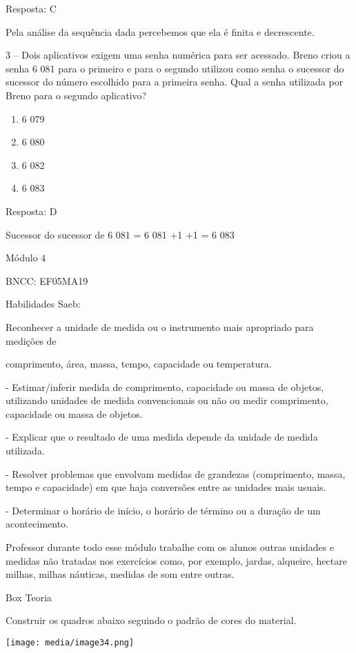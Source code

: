 Resposta: C

Pela análise da sequência dada percebemos que ela é finita e
decrescente.

3 -- Dois aplicativos exigem uma senha numérica para ser acessado. Breno
criou a senha 6 081 para o primeiro e para o segundo utilizou como senha
o sucessor do sucessor do número escolhido para a primeira senha. Qual a
senha utilizada por Breno para o segundo aplicativo?

\begin{enumerate}
\def\labelenumi{\alph{enumi})}
\item
  6 079
\item
  6 080
\item
  6 082
\item
  6 083
\end{enumerate}

Resposta: D

Sucessor do sucessor de 6 081 = 6 081 +1 +1 = 6 083

Módulo 4

BNCC: EF05MA19

Habilidades Saeb:

Reconhecer a unidade de medida ou o instrumento mais apropriado para
medições de

comprimento, área, massa, tempo, capacidade ou temperatura.

- Estimar/inferir medida de comprimento, capacidade ou massa de objetos,
utilizando unidades de medida convencionais ou não ou medir comprimento,
capacidade ou massa de objetos.

- Explicar que o resultado de uma medida depende da unidade de medida
utilizada.

- Resolver problemas que envolvam medidas de grandezas (comprimento,
massa, tempo e capacidade) em que haja conversões entre as unidades mais
usuais.

- Determinar o horário de início, o horário de término ou a duração de
um acontecimento.

Professor durante todo esse módulo trabalhe com os alunos outras
unidades e medidas não tratadas nos exercícios como, por exemplo,
jardas, alqueire, hectare milhas, milhas náuticas, medidas de som entre
outras.

Box Teoria

Construir os quadros abaixo seguindo o padrão de cores do material.

\texttt{[image: media/image34.png]}

